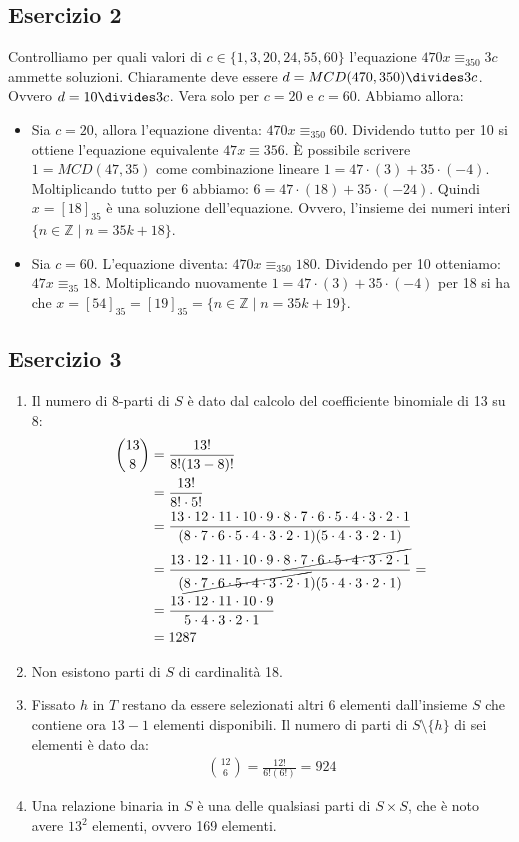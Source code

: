 \subsection*{Esercizio 2}
Controlliamo per quali valori di $c \in \{1,3,20,24,55,60\}$ l'equazione $470x \equiv_{350} 3c$ ammette soluzioni. Chiaramente deve essere $d = MCD(470,350) \divides 3c$. Ovvero $d=10 \divides 3c$. Vera solo per $c=20$ e $c=60$. Abbiamo allora:
\begin{itemize}
	\item Sia $c=20$, allora l'equazione diventa: $470x \equiv_{350} 60$. Dividendo tutto per 10 si ottiene l'equazione equivalente $47x \equiv{35} 6$. È possibile scrivere $1=MCD(47,35)$ come combinazione lineare $1=47\cdot(3)+35\cdot(-4)$. Moltiplicando tutto per 6 abbiamo: $6=47 \cdot (18)+35 \cdot(-24)$. Quindi $x=[18]_{35}$ è una soluzione dell'equazione. Ovvero, l'insieme dei numeri interi $\{n \in \mathbb{Z} \; | \; n = 35k+18 \}$.
	\item Sia $c=60$. L'equazione diventa: $470x \equiv_{350} 180$. Dividendo per 10 otteniamo: $47x \equiv_{35} 18$. Moltiplicando nuovamente $1=47\cdot(3)+35\cdot(-4)$ per 18 si ha che $x=[54]_{35}=[19]_{35}=\{n \in \mathbb{Z} \; | \; n=35k+19 \}$.
\end{itemize}
\subsection*{Esercizio 3}
\begin{enumerate}[label=(\textit{\roman*})]
	\item Il numero di $8$-parti di $S$ è dato dal calcolo del coefficiente binomiale di 13 su 8:
	\begin{align*}
		\binom{13}{8} &= \frac{13!}{8!(13-8)!}\\
		&=\frac{13!}{8! \cdot 5!} \\
		&= \frac{13 \cdot 12 \cdot 11 \cdot 10 \cdot 9 \cdot 8 \cdot 7 \cdot 6 \cdot 5 \cdot 4 \cdot 3 \cdot 2 \cdot 1}{(8 \cdot 7 \cdot 6 \cdot 5 \cdot 4 \cdot 3 \cdot 2 \cdot 1)(5 \cdot4 \cdot 3 \cdot 2 \cdot 1)} \\
		&= \frac{13 \cdot 12 \cdot 11 \cdot 10 \cdot 9 \cdot \cancel{8 \cdot 7 \cdot 6 \cdot 5 \cdot 4 \cdot 3 \cdot 2 \cdot 1}}{(\cancel{8 \cdot 7 \cdot 6 \cdot 5 \cdot 4 \cdot 3 \cdot 2 \cdot 1})(5 \cdot4 \cdot 3 \cdot 2 \cdot 1)} = \\
		&=\frac{13 \cdot 12 \cdot 11 \cdot 10 \cdot 9}{5 \cdot4 \cdot 3 \cdot 2 \cdot 1}\\
		&=1287
	\end{align*}
	\item Non esistono parti di $S$ di cardinalità 18.
	\item Fissato $h$ in $T$ restano da essere selezionati altri 6 elementi dall'insieme $S$ che contiene ora $13-1$ elementi disponibili. Il numero di parti di $S\setminus\{h\}$ di sei elementi è dato da:
	\begin{align*}
		\binom{12}{6} = \frac{12!}{6!(6!)} = 924
	\end{align*}
	\item Una relazione binaria in $S$ è una delle qualsiasi parti di $S \times S$, che è noto avere $13^{2}$ elementi, ovvero 169 elementi.
\end{enumerate}
